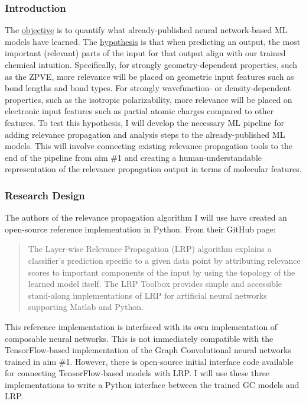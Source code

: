 \documentclass[12pt]{article}
\begin{document}
\subsubsection{Introduction}
\label{sec:org97d6cc8}

The \uline{objective} is to quantify what already-published neural network-based ML models have learned. The \uline{hypothesis} is that when predicting an output, the most important (relevant) parts of the input for that output align with our trained chemical intuition. Specifically, for strongly geometry-dependent properties, such as the ZPVE, more relevance will be placed on geometric input features such as bond lengths and bond types. For strongly wavefunction- or density-dependent properties, such as the isotropic polarizability, more relevance will be placed on electronic input features such as partial atomic charges compared to other features. To test this hypothesis, I will develop the necessary ML pipeline for adding relevance propagation and analysis steps to the already-published ML models. This will involve connecting existing relevance propagation tools \cite{JMLR:v17:15-618,github:lrp,github:lrp_tf,github:lrp_tf2} to the end of the pipeline from aim \#1 and creating a human-understandable representation of the relevance propagation output in terms of molecular features.

\subsubsection{Research Design}
\label{sec:org389a26b}

The authors of the relevance propagation algorithm I will use have created an open-source reference implementation in Python. From their GitHub page\cite{github:lrp}:

\begin{quote}
The Layer-wise Relevance Propagation (LRP) algorithm explains a classifier's prediction specific to a given data point by attributing relevance scores to important components of the input by using the topology of the learned model itself. The LRP Toolbox provides simple and accessible stand-along implementations of LRP for artificial neural networks supporting Matlab and Python.
\end{quote}

This reference implementation is interfaced with its own implementation of composable neural networks. This is not immediately compatible with the TensorFlow-based implementation of the Graph Convolutional neural networks trained in aim \#1. However, there is open-source initial interface code available for connecting TensorFlow-based models with LRP\cite{github:lrp_tf,github:lrp_tf2}. I will use these three implementations to write a Python interface between the trained GC models and LRP.
\end{document}
